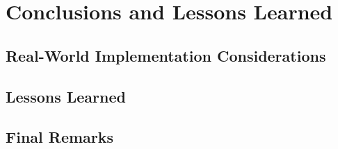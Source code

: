 \section{Conclusions and Lessons Learned}
\label{sec:conclusions}



\subsection{Real-World Implementation Considerations}

\subsection{Lessons Learned}

\subsection{Final Remarks}
